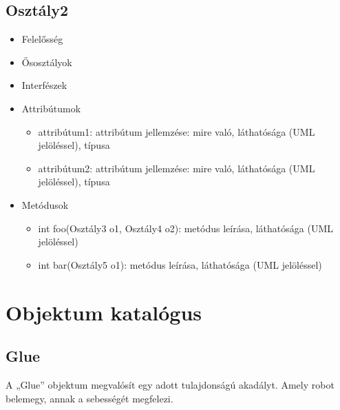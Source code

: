 \subsection{Osztály2}
\begin{itemize}
\item Felelősség\newline
{}
\item Ősosztályok\newline
{}
\item Interfészek\newline
{}
\item Attribútumok\newline
{}
	\begin{itemize}
		\item attribútum1: attribútum jellemzése: mire való, láthatósága (UML jelöléssel), típusa
		\item attribútum2: attribútum jellemzése: mire való, láthatósága (UML jelöléssel), típusa
	\end{itemize}
\item Metódusok\newline
{}
	\begin{itemize}
		\item int foo(Osztály3 o1, Osztály4 o2): metódus leírása, láthatósága (UML jelöléssel)
		\item int bar(Osztály5 o1): metódus leírása, láthatósága (UML jelöléssel)
	\end{itemize}
\end{itemize}

\section{Objektum katalógus}

\subsection{Glue}
A „Glue” objektum megvalósít egy adott tulajdonságú akadályt. Amely robot belemegy, annak a sebességét megfelezi. 
